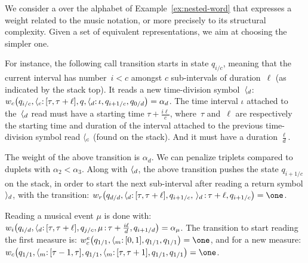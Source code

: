 \begin{example} \label{ex:SWVPA}
We consider a \SWVPA over the alphabet of Example~\ref{ex:nested-word}
that expresses a weight related to the music notation,
or more precisely to its structural complexity.
Given a set of equivalent representations, we aim at choosing the simpler one.

%
For instance, the following call transition starts in state
$q_{{i}/{c}}$, meaning that the current interval has number~$i < c$
amongst $c$ sub-intervals of duration~$\ell$ (as indicated by the stack top).
It reads a new time-division symbol~$\langle_{d}$:
\(
\weic\bigl(q_{{i}/{c}},
           \ccall{c}\ts{[\tau, \tau+\ell]}, q,
           \ccall{d}\ts{\iota}, q_{{i+1}/{c}},
           q_{{0}/{d}} \bigr) = \alpha_d
\).
The time interval $\iota$ attached to the~$\langle_{d}$ read 
must have a starting time $\tau + \frac{i\ell}{c}$,
where~$\tau$ and~$\ell$ are respectively
the starting time and duration of the interval attached to
the previous time-division symbol read $\langle_{c}$ (found on the stack).
%
And it must have a duration $\frac{\ell}{d}$.

\noindent
The weight of the above transition is $\alpha_d$.
We can penalize \eg triplets compared to duplets with $\alpha_2 < \alpha_3$.
%
\noindent
Along with $\langle_{d}$,
the above transition pushes
the state $q_{{i+1}/{c}}$ on the stack,
in order to start the next sub-interval after reading 
a return symbol $\rangle_{d}$,
with the transition:
\(
\weir\bigl(q_{{d}/{d}},
           \ccall{d}\ts{[\tau, \tau+\ell]}, q_{{i+1}/{c}},
           \,\creturn{d}\ts{\tau + \ell}, q_{{i+1}/{c}} \bigr) = \one
\).

\noindent
Reading a musical event $\mu$ is done with:
\(
\weii\bigl(q_{{i}/{d}},
           \ccall{d}\ts{[\tau, \tau+\ell]}, q_{{j}/{c}},
           \mu\ts{\tau + \frac{i\ell}{d}}, q_{{i+1}/{d}} \bigr) = \alpha_\mu
\).
The transition to start reading the first measure is:
\(
\weiec\bigl(q_{1/1},
           \ccall{\mathsf{m}}\ts{[0, 1]}, q_{1/1},
           q_{1/1} \bigr) = \one
\),
and for a new measure:
\(
\weic\bigl(q_{1/1},
          \ccall{\mathsf{m}}\ts{[\tau-1, \tau]}, q_{1/1},
          \ccall{\mathsf{m}}\ts{[\tau, \tau+1]}, q_{1/1},
          q_{1/1} \bigr) = \one
\).
\endex
\end{example}

